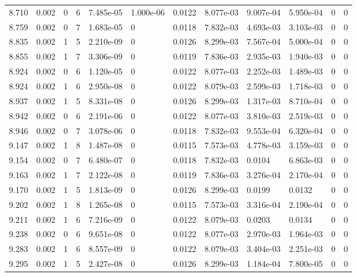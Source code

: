 \documentclass[preview]{standalone}
\begin{document}
{{{{{{\begin{tabular}{L{1.2cm}C{1.2cm} C{0.3cm}C{0.5cm} C{1.4cm}C{1.4cm} C{1.4cm}C{1.4cm} C{1.6cm}C{1.6cm} C{1.6cm}C{1.6cm}}
  8.710  &  0.002  & 0     &  6 &  7.485e-05  & 1.000e-06  &  0.0122&   8.077e-03& 9.007e-04 & 5.950e-04   &  0 & 0  \\ 
  8.759  &  0.002  & 0     &  7 &  1.683e-05  & 0  &  0.0118&   7.832e-03& 4.693e-03 & 3.103e-03   &  0 & 0  \\ 
  8.835  &  0.002  & 1     &  5 &  2.210e-09  & 0  &  0.0126&   8.299e-03& 7.567e-04 & 5.000e-04   &  0 & 0  \\ 
  8.855  &  0.002  & 1     &  7 &  3.306e-09  & 0  &  0.0119&   7.836e-03& 2.935e-03 & 1.940e-03   &  0 & 0  \\ 
  8.924  &  0.002  & 0     &  6 &  1.120e-05  & 0  &  0.0122&   8.077e-03& 2.252e-03 & 1.489e-03   &  0 & 0  \\ 
  8.924  &  0.002  & 1     &  6 &  2.950e-08  & 0  &  0.0122&   8.079e-03& 2.599e-03 & 1.718e-03   &  0 & 0  \\ 
  8.937  &  0.002  & 1     &  5 &  8.331e-08  & 0  &  0.0126&   8.299e-03& 1.317e-03 & 8.710e-04   &  0 & 0  \\ 
  8.942  &  0.002  & 0     &  6 &  2.191e-06  & 0  &  0.0122&   8.077e-03& 3.810e-03 & 2.519e-03   &  0 & 0  \\ 
  8.946  &  0.002  & 0     &  7 &  3.078e-06  & 0  &  0.0118&   7.832e-03& 9.553e-04 & 6.320e-04   &  0 & 0  \\ 
  9.147  &  0.002  & 1     &  8 &  1.487e-08  & 0  &  0.0115&   7.573e-03& 4.778e-03 & 3.159e-03   &  0 & 0  \\ 
  9.154  &  0.002  & 0     &  7 &  6.480e-07  & 0  &  0.0118&   7.832e-03& 0.0104 & 6.863e-03   &  0 & 0  \\ 
  9.163  &  0.002  & 1     &  7 &  2.122e-08  & 0  &  0.0119&   7.836e-03& 3.276e-04 & 2.170e-04   &  0 & 0  \\ 
  9.170  &  0.002  & 1     &  5 &  1.813e-09  & 0  &  0.0126&   8.299e-03& 0.0199 & 0.0132   &  0 & 0  \\ 
  9.202  &  0.002  & 1     &  8 &  1.265e-08  & 0  &  0.0115&   7.573e-03& 3.316e-04 & 2.190e-04   &  0 & 0  \\ 
  9.211  &  0.002  & 1     &  6 &  7.216e-09  & 0  &  0.0122&   8.079e-03& 0.0203 & 0.0134   &  0 & 0  \\ 
  9.238  &  0.002  & 0     &  6 &  9.651e-08  & 0  &  0.0122&   8.077e-03& 2.970e-03 & 1.964e-03   &  0 & 0  \\ 
  9.283  &  0.002  & 1     &  6 &  8.557e-09  & 0  &  0.0122&   8.079e-03& 3.404e-03 & 2.251e-03   &  0 & 0  \\ 
  9.295  &  0.002  & 1     &  5 &  2.427e-08  & 0  &  0.0126&   8.299e-03& 1.184e-04 & 7.800e-05   &  0 & 0  \\ 

\end{tabular}}}}}}}
\end{document}
